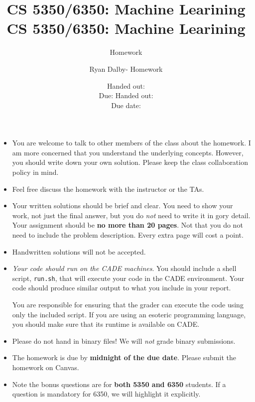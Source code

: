 \documentclass[12pt, fullpage,letterpaper]{article}
\title{CS 5350/6350: Machine Learining \semester}
\author{Homework \assignmentId}
\date{Handed out: \releaseDate\\
	Due: \dueDate}
\title{CS 5350/6350: Machine Learining \semester}
\author{Ryan Dalby- Homework \assignmentId}
\date{Handed out: \releaseDate\\
  Due date: \dueDate}
\begin{document}
\maketitle


{\footnotesize
	\begin{itemize}
		\item You are welcome to talk to other members of the class about
		the homework. I am more concerned that you understand the
		underlying concepts. However, you should write down your own
		solution. Please keep the class collaboration policy in mind.
		
		\item Feel free discuss the homework with the instructor or the TAs.
		
		\item Your written solutions should be brief and clear. You need to
		show your work, not just the final answer, but you do \emph{not}
		need to write it in gory detail. Your assignment should be {\bf no
			more than 20 pages}. Not that you do not need to include the problem description. Every extra page will cost a point.
		
		\item Handwritten solutions will not be accepted.
		
		
		\item {\em Your code should run on the CADE machines}. You should
		include a shell script, {\tt run.sh}, that will execute your code
		in the CADE environment. Your code should produce similar output
		to what you include in your report.
		
		You are responsible for ensuring that the grader can execute the
		code using only the included script. If you are using an
		esoteric programming language, you should make sure that its
		runtime is available on CADE.
		
		\item Please do not hand in binary files! We will {\em not} grade
		binary submissions.
		
		\item The homework is due by \textbf{midnight of the due date}. Please submit
		the homework on Canvas.
		
		\item Note the bonus questions are for \textbf{both 5350 and 6350} students. If a question is mandatory for 6350, we will highlight it explicitly. 
		
	\end{itemize}
}
\end{document}
